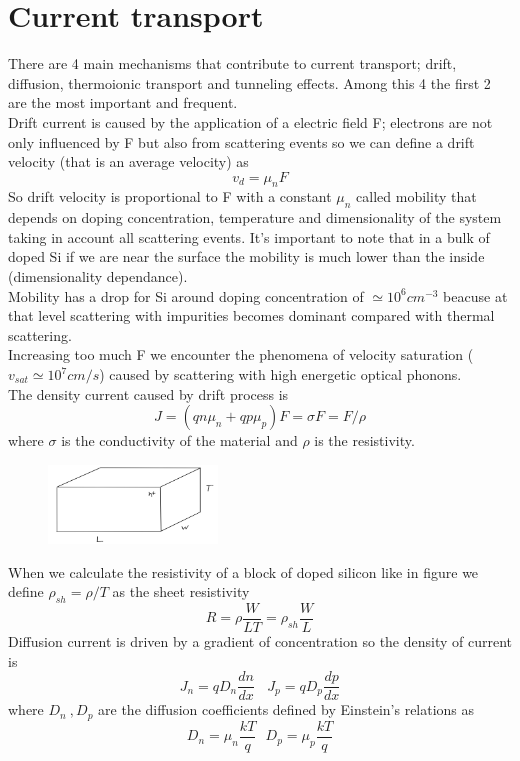 \section{Current transport}
There are 4 main mechanisms that contribute to current transport; drift, diffusion, thermoionic transport and tunneling effects. Among this 4 the first 2 are the most important and frequent.\\
\vspace{2mm}
Drift current is caused by the application of a electric field F; electrons are not only influenced by F but also from scattering events so we can define a drift velocity (that is an average velocity) as 
\begin{equation}
v_d=\mu_n F
\end{equation}
So drift velocity is proportional to F with a constant $\mu_n$ called mobility that depends on doping concentration, temperature and dimensionality of the system taking in account all scattering events. It's important to note that in a bulk of doped Si if we are near the surface the mobility is much lower than the inside (dimensionality dependance).\\
Mobility has a drop for Si around doping concentration of $\simeq 10^6 cm^{-3}$ beacuse at that level scattering with impurities becomes dominant compared with thermal scattering.\\
Increasing too much F we encounter the phenomena of velocity saturation ($v_{sat}\simeq 10^7 cm/s$) caused by scattering with high energetic optical phonons.\\
The density current caused by drift process is 
\begin{equation}
J=(qn\mu_n + qp\mu_p)F=\sigma F=F/\rho
\end{equation}
where $\sigma$ is the conductivity of the material and $\rho$ is the resistivity.\\

\begin{figure}
\includegraphics[width=0.4\textwidth]{shrho.png}
\end{figure}

When we calculate the resistivity of a block of doped silicon like in figure we define $\rho_{sh}=\rho/T$ as the sheet resistivity
\begin{equation}
R=\rho\frac{W}{LT}=\rho_{sh}\frac{W}{L} 
\end{equation}
Diffusion current is driven by a gradient of concentration so the density of current is 
\begin{equation}
J_n=qD_n\frac{dn}{dx} \ \ \ \ J_p=qD_p\frac{dp}{dx}
\end{equation}
where $D_n\ ,D_p$ are the diffusion coefficients defined by Einstein's relations as 
\begin{equation}
D_n=\mu_n\frac{kT}{q}\ \ \ D_p=\mu_p\frac{kT}{q}
\end{equation}
\newline
